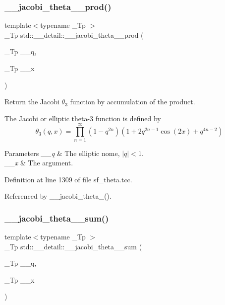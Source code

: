 \subsubsection{\texorpdfstring{\+\_\+\+\_\+jacobi\+\_\+theta\+\_\+\_\+prod()}{\_\_jacobi\_theta\_3\_prod()}}
{\footnotesize\ttfamily template$<$typename \+\_\+\+Tp $>$ \\
\+\_\+\+Tp std\+::\+\_\+\+\_\+detail\+::\+\_\+\+\_\+jacobi\+\_\+theta\+\_\+\_\+prod (\begin{DoxyParamCaption}\item[{\+\_\+\+Tp}]{\+\_\+\+\_\+q,  }\item[{\+\_\+\+Tp}]{\+\_\+\+\_\+x }\end{DoxyParamCaption})}

Return the Jacobi $ \theta_3 $ function by accumulation of the product.

The Jacobi or elliptic theta-\/3 function is defined by \[ \theta_3(q,x) = \prod_{n=1}^{\infty} (1 - q^{2n})(1 + 2q^{2n-1}\cos(2x) + q^{4n-2}) \]


\begin{DoxyParams}{Parameters}
{\em \+\_\+\+\_\+q} & The elliptic nome, $ |q| < 1 $. \\
\hline
{\em \+\_\+\+\_\+x} & The argument. \\
\hline
\end{DoxyParams}


Definition at line 1309 of file sf\+\_\+theta.\+tcc.



Referenced by \+\_\+\+\_\+jacobi\+\_\+theta\+\_().

\mbox{\label{namespacestd_1_1____detail_a07e080795e7f80c5a0b733d6bac49675}} 
\subsubsection{\texorpdfstring{\+\_\+\+\_\+jacobi\+\_\+theta\+\_\+\_\+sum()}{\_\_jacobi\_theta\_3\_sum()}}
{\footnotesize\ttfamily template$<$typename \+\_\+\+Tp $>$ \\
\+\_\+\+Tp std\+::\+\_\+\+\_\+detail\+::\+\_\+\+\_\+jacobi\+\_\+theta\+\_\+\_\+sum (\begin{DoxyParamCaption}\item[{\+\_\+\+Tp}]{\+\_\+\+\_\+q,  }\item[{\+\_\+\+Tp}]{\+\_\+\+\_\+x }\end{DoxyParamCaption})}

